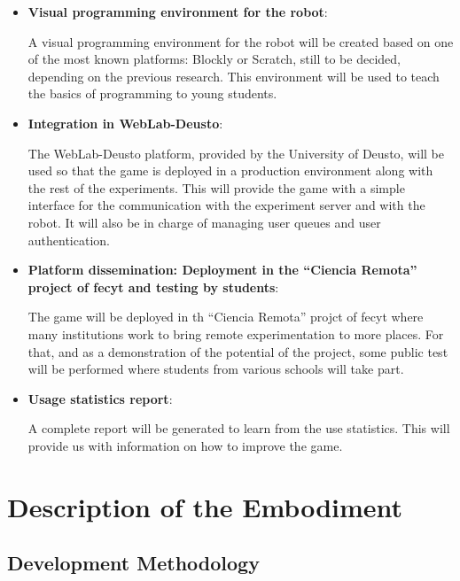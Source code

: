 \begin{itemize}
\item \textbf{Visual programming environment for the robot}:

A visual programming environment for the robot will be created based on one of the most known
platforms: Blockly or Scratch, still to be decided, depending on the previous research. This
environment will be used to teach the basics of programming to young students.

\item \textbf{Integration in WebLab-Deusto}:

The WebLab-Deusto platform, provided by the University of Deusto, will be used so that the game
is deployed in a production environment along with the rest of the experiments. This will provide
the game with a simple interface for the communication with the experiment server and with the
robot. It will also be in charge of managing user queues and user authentication.

\item \textbf{Platform dissemination: Deployment in the ``Ciencia Remota'' project of
\acrshort{fecyt} and testing by students}:

The game will be deployed in th ``Ciencia Remota'' projct of \acrshort{fecyt} where many
institutions work to bring remote experimentation to more places. For that, and as a demonstration
of the potential of the project, some public test will be performed where students from various
schools will take part.

\item \textbf{Usage statistics report}:

A complete report will be generated to learn from the use statistics. This will provide us with
information on how to improve the game.

\end{itemize}

\section{Description of the Embodiment}

\subsection{Development Methodology}

